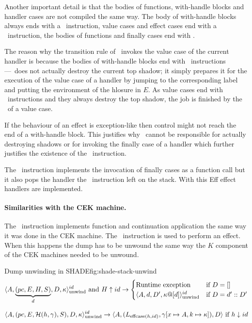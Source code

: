 \documentclass[class=article, crop=false]{standalone}
\begin{document}
Another important detail is that the bodies of functions, with-handle blocks and
handler cases are not compiled the same way. The body of with-handle blocks always ends with a \vmKillShadow\ 
instruction, value cases and effect cases end with a \vmRett\ instruction, the bodies of functions and
finally cases end with \vmRet.

The reason why the transition rule of \vmKillShadow\ invokes the value case of the current handler is
because the bodies of with-handle blocks end with \vmKillShadow\ instructions---\vmKillShadow\ does not actually destroy
the current top shadow; it simply prepares it for the execution of the value case of a handler by jumping to
the corresponding label and putting the environment of the hlosure in $E$. As value cases end with \vmRett\
instructions and they always destroy the top shadow, the job is finished by the \vmRett\ of a value case.

If the behaviour of an effect is exception-like then control might not reach the end of a with-handle block.
This justifies why \vmKillShadow\ cannot be responsible for actually destroying shadows or for invoking the
finally case of a handler which further justifies the existence of the \vmFin\ instruction.

The \vmFin\ instruction implements the invocation of finally cases as a function call but it also pops
the handler the \vmCastShadow\ instruction left on the stack. With this Eff effect handlers are implemented.

\paragraph{Similarities with the CEK machine.}
The \vmApply\ instruction implements function and continuation application the same way it was done in the
CEK machine. The \vmThrow\ instruction is used to perform an effect. When this happens the dump has to be unwound
the same way the $K$ component of the CEK machines needed to be unwound.


\begin{myfigure}[1]{Dump unwinding in SHADE}{fig:shade-stack-unwind}
    $$ \langle A, \underbrace{(pc, E, H, S)}_d, D, \kappa  \rangle_\text{unwind}^{id} \text{ and } H \uparrow id \to \begin{cases}
        \text{Runtime exception} & \text{if } D = [] \\
    \langle A, d, D', \kappa @ [d] \rangle_\text{unwind}^{id} & \text{if } D = d' :: D' \end{cases} $$

    $$ \langle A, (pc, E, \mathcal{H}(h, \gamma), S), D, \kappa \rangle_\text{unwind}^{id} \to
        \langle A, (L_{\text{effcase}(h, id)}, \gamma[x \mapsto A, k \mapsto \kappa] ), D \rangle \text{ if } h \downarrow id $$
\end{myfigure}
\end{document}
